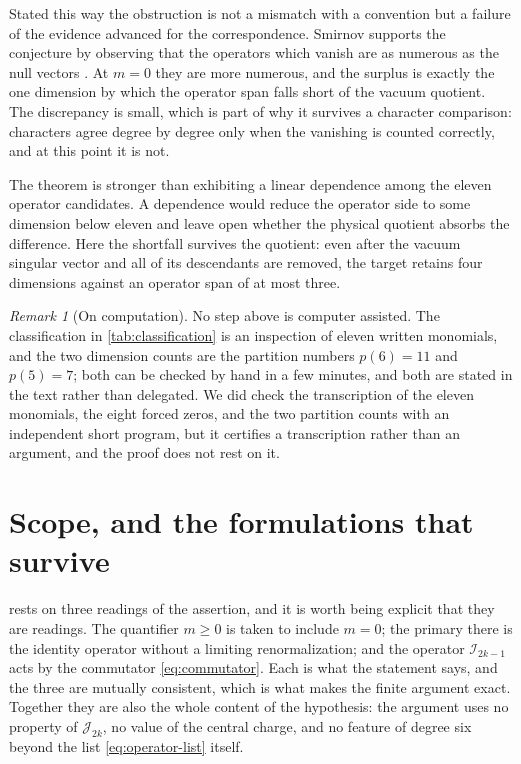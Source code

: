 \documentclass[11pt,reqno]{amsart}
\theoremstyle{plain}
\theoremstyle{definition}
\theoremstyle{remark}
\newtheorem{remark}[theorem]{Remark}
\numberwithin{equation}{section}
\newcommand{\Iop}{\mathcal I}
\newcommand{\Jop}{\mathcal J}
\begin{document}
Stated this way the obstruction is not a mismatch with a convention but a
failure of the evidence advanced for the correspondence. Smirnov supports the
conjecture by observing that the operators which vanish are as numerous as the
null vectors \cite{Smirnov_1998so}. At $m=0$ they are more
numerous, and the surplus is exactly the one dimension by which the operator
span falls short of the vacuum quotient. The discrepancy is small, which is
part of why it survives a character comparison: characters agree degree by
degree only when the vanishing is counted correctly, and at this point it is
not.

The theorem is stronger than exhibiting a linear dependence among the eleven
operator candidates. A dependence would reduce the operator side to some
dimension below eleven and leave open whether the physical quotient absorbs
the difference. Here the shortfall survives the quotient: even after the
vacuum singular vector and all of its descendants are removed, the target
retains four dimensions against an operator span of at most three.

\begin{remark}[On computation]
\label{rem:verification}
No step above is computer assisted. The classification in
\cref{tab:classification} is an inspection of eleven written monomials, and
the two dimension counts are the partition numbers $p(6)=11$ and $p(5)=7$;
both can be checked by hand in a few minutes, and both are stated in the text
rather than delegated. We did check the transcription of the eleven monomials,
the eight forced zeros, and the two partition counts with an independent
short program, but it certifies a transcription rather than an argument, and
the proof does not rest on it.
\end{remark}

\section{Scope, and the formulations that survive}
\label{sec:boundary}

 rests on three readings of the assertion, and it is
worth being explicit that they are readings. The quantifier $m\ge0$ is taken
to include $m=0$; the primary there is the identity operator without a
limiting renormalization; and the operator $\Iop_{2k-1}$ acts by the
commutator \eqref{eq:commutator}. Each is what the statement says, and the
three are mutually consistent, which is what makes the finite argument exact.
Together they are also the whole content of the hypothesis: the argument uses
no property of $\Jop_{2k}$, no value of the central charge, and no feature of
degree six beyond the list \eqref{eq:operator-list} itself.
\end{document}
